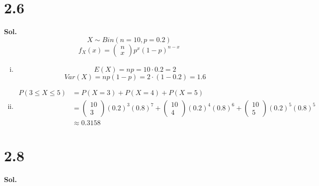 \documentclass[a4paper, 12pt]{article}  %
\begin{document}
\section*{2.6}
\textbf{Sol.}
    $$X\sim Bin(n=10, p=0.2)$$
    $$f_X(x)=\begin{pmatrix}
        n \\
        x 
    \end{pmatrix}p^x(1-p)^{n-x}$$
    \begin{enumerate}[i.]
        \item $$E(X)=np=10\cdot 0.2=2$$ $$Var(X)=np(1-p)=2\cdot (1-0.2)=1.6$$
        \item 
        \begin{align*}
           P(3\le X \le 5) &= P(X=3)+P(X=4)+P(X=5) \\
            &= {\begin{pmatrix} 10 \\ 3 \end{pmatrix}}(0.2)^3(0.8)^7
            +{\begin{pmatrix} 10 \\ 4 \end{pmatrix}}(0.2)^4(0.8)^6
            +{\begin{pmatrix} 10 \\ 5 \end{pmatrix}}(0.2)^5(0.8)^5 \\
            &\approx 0.3158
        \end{align*}
    \end{enumerate}

\section*{2.8}
\textbf{Sol.}
\end{document}
